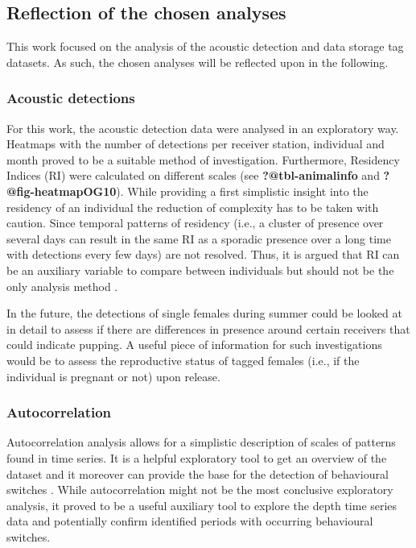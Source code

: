\documentclass[
  authoryear,
  review,
  3p]{elsarticle}
\begin{document}
\hypertarget{sec-disc-reflection}{%
\subsection{Reflection of the chosen
analyses}\label{sec-disc-reflection}}

This work focused on the analysis of the acoustic detection and data
storage tag datasets. As such, the chosen analyses will be reflected
upon in the following.

\hypertarget{sec-disc-reflection-acoustic}{%
\subsubsection{Acoustic detections}\label{sec-disc-reflection-acoustic}}

For this work, the acoustic detection data were analysed in an
exploratory way. Heatmaps with the number of detections per receiver
station, individual and month proved to be a suitable method of
investigation. Furthermore, Residency Indices (RI) were calculated on
different scales (see \textbf{?@tbl-animalinfo} and
\textbf{?@fig-heatmapOG10}). While providing a first simplistic insight
into the residency of an individual the reduction of complexity has to
be taken with caution. Since temporal patterns of residency (i.e., a
cluster of presence over several days can result in the same RI as a
sporadic presence over a long time with detections every few days) are
not resolved. Thus, it is argued that RI can be an auxiliary variable to
compare between individuals but should not be the only analysis method
\citep{kraft_2023}.

In the future, the detections of single females during summer could be
looked at in detail to assess if there are differences in presence
around certain receivers that could indicate pupping. A useful piece of
information for such investigations would be to assess the reproductive
status of tagged females (i.e., if the individual is pregnant or not)
upon release.

\hypertarget{sec-disc-reflection-acf}{%
\subsubsection{Autocorrelation}\label{sec-disc-reflection-acf}}

Autocorrelation analysis allows for a simplistic description of scales
of patterns found in time series. It is a helpful exploratory tool to
get an overview of the dataset \citep{dray_2010} and it moreover can
provide the base for the detection of behavioural switches
\citep{gurarie_2016}. While autocorrelation might not be the most
conclusive exploratory analysis, it proved to be a useful auxiliary tool
to explore the depth time series data and potentially confirm identified
periods with occurring behavioural switches.
\end{document}
